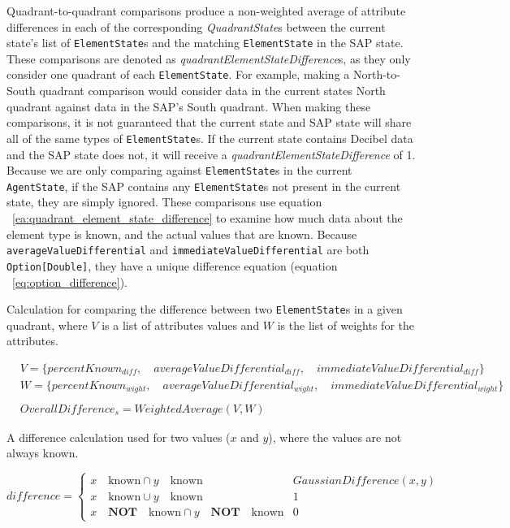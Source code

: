 Quadrant-to-quadrant comparisons produce a non-weighted average of attribute differences in each of the corresponding \textit{QuadrantState}s between the current state's list of \texttt{ElementState}s and the matching \texttt{ElementState} in the SAP state.
These comparisons are denoted as \textit{quadrantElementStateDifference}s, as they only consider one quadrant of each \texttt{ElementState}.
For example, making a North-to-South quadrant comparison would consider data in the current states North quadrant against data in the SAP's South quadrant.
When making these comparisons, it is not guaranteed that the current state and SAP state will share all of the same types of \texttt{ElementState}s.
If the current state contains Decibel data and the SAP state does not, it will receive a \textit{quadrantElementStateDifference} of 1.
Because we are only comparing against \texttt{ElementState}s in the current \texttt{AgentState}, if the SAP contains any \texttt{ElementState}s not present in the current state, they are simply ignored.
These comparisons use equation ~\ref{ea:quadrant_element_state_difference} to examine how much data about the element type is known, and the actual values that are known.
Because \texttt{averageValueDifferential} and \texttt{immediateValueDifferential} are both \texttt{Option[Double]}, they have a unique difference equation (equation ~\ref{eq:option_difference}).

\caption{Calculation for comparing the difference between two \texttt{ElementState}s in a given quadrant, where $V$ is a list of attributes values and $W$ is the list of weights for the attributes.}
\begin{equation} \label{eq:scanning_overall_difference}
\begin{align}
  &V = \{percentKnown_{diff},\quad averageValueDifferential_{diff},\quad immediateValueDifferential_{diff}\} \\
  &W = \{percentKnown_{wight},\quad averageValueDifferential_{wight},\quad immediateValueDifferential_{wight}\} \\
  &\\
  &OverallDifference_{s} = WeightedAverage(V,W)
\end{align}
\end{equation}

\caption{A difference calculation used for two values ($x$ and $y$), where the values are not always known.}
\begin{equation} \label{eq:option_difference}
  difference = \begin{cases}
    x \quad \text{known} \cap y \quad \text{known} & GaussianDifference(x,y) \\
    x \quad \text{known} \cup y \quad \text{known} & 1 \\
    x \quad \textbf{NOT} \quad \text{known} \cap y \quad \textbf{NOT} \quad \text{known} & 0
\end{cases}
\end{equation}



